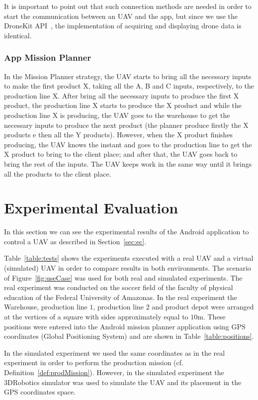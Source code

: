 \documentclass[12pt]{article}
\begin{document}
It is important to point out that such connection methods are needed in order to start the communication between an UAV and the app, but since we use the DroneKit API~\cite{dronekit}, the implementation of acquiring and displaying drone data is identical.

\subsubsection{App Mission Planner}
\label{subsubsec:mp}
In the Mission Planner strategy, the UAV starts to bring all the necessary inputs to make the first product X, taking all the A, B and C inputs, respectively, to the production line X. After bring all the necessary inputs to produce the first X product, the production line X starts to produce the X product and while the production line X is producing, the UAV goes to the warehouse to get the necessary inputs to produce the next product (the planner produce firstly the X products e then all the Y products). However, when the X product finishes producing, the UAV knows the instant and goes to the production line to get the X product to bring to the client place; and after that, the UAV goes back to bring the rest of the inputs. The UAV keeps work in the same way until it brings all the products to the client place.

\section{Experimental Evaluation}
\label{sec:results}

In this section we can see the experimental results of the Android application to control a UAV as described in Section~\ref{sec:ec}.

Table~\ref{table:tests} shows the experiments executed with a real UAV and a virtual (simulated) UAV in order to compare results in both environments.  The scenario of Figure~\ref{fig:useCase} was used for both real and simulated experiments. The real experiment was conducted on the soccer field of the faculty of physical education of the Federal University of Amazonas. In the real experiment the Warehouse, production line $1$, production line $2$ and product depot were arranged at the vertices of a square with sides approximately equal to $10$m. These positions were entered into the Android mission planner application using GPS coordinates (Global Positioning System) and are shown in Table~\ref{table:positions}.

In the simulated experiment we used the same coordinates as in the real experiment in order to perform the production mission (cf. Definition~\ref{def:prodMission}). However, in the simulated experiment the 3DRobotics simulator was used to simulate the UAV and its placement in the GPS coordinates space.
\end{document}
